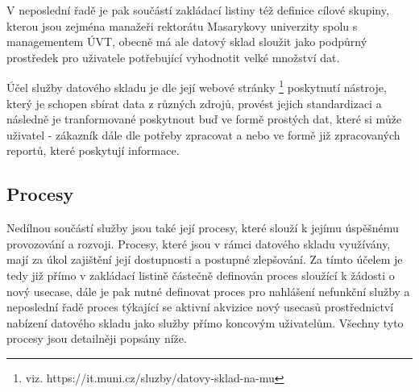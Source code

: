 \documentclass[
  digital,     %
  twoside,     %
  lof,         %
  lot,         %
]{fithesis4}
\begin{document}
V neposlední řadě je pak součástí zakládací listiny též definice cílové skupiny, kterou jsou zejména manažeři rektorátu Masarykovy univerzity spolu s managementem ÚVT, obecně má ale datový sklad sloužit jako podpůrný prostředek pro uživatele potřebující vyhodnotit velké množství dat.

Účel služby datového skladu je dle její webové stránky \footnote{viz. https://it.muni.cz/sluzby/datovy-sklad-na-mu} poskytnutí nástroje, který je schopen sbírat data z různých zdrojů, provést jejich standardizaci a následně je tranformované poskytnout buď ve formě prostých dat, které si může uživatel - zákazník dále dle potřeby zpracovat a nebo ve formě již zpracovaných reportů, které poskytují informace. 

\subsection{Procesy}
Nedílnou součástí služby jsou také její procesy, které slouží k jejímu úspěšnému provozování a rozvoji. Procesy, které jsou v rámci datového skladu využívány, mají za úkol zajištění její dostupnosti a postupné zlepšování. Za tímto účelem je tedy již přímo v zakládací listině částečně definován proces sloužící k žádosti o nový usecase, dále je pak nutné definovat proces pro nahlášení nefunkční služby a neposlední řadě proces týkající se aktivní akvizice nový usecasů prostřednictví nabízení datového skladu jako služby přímo koncovým uživatelům. Všechny tyto procesy jsou detailněji popsány níže.
\end{document}
